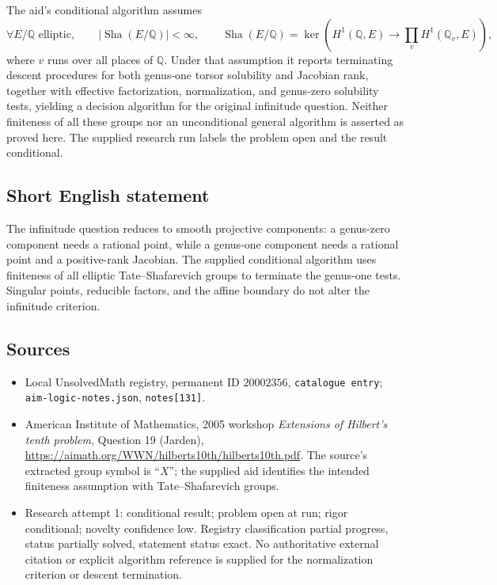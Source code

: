 \documentclass[11pt]{article}
\newcommand{\Q}{\mathbb{Q}}
\begin{document}
The aid's conditional algorithm assumes
\[
\forall E/\Q\text{ elliptic},\qquad |\operatorname{Sha}(E/\Q)|<\infty,
\qquad
\operatorname{Sha}(E/\Q)=\ker\left(H^1(\Q,E)\to\prod_v H^1(\Q_v,E)\right),
\]
where $v$ runs over all places of $\Q$. Under that assumption it reports terminating descent procedures for both genus-one torsor solubility and Jacobian rank, together with effective factorization, normalization, and genus-zero solubility tests, yielding a decision algorithm for the original infinitude question. Neither finiteness of all these groups nor an unconditional general algorithm is asserted as proved here. The supplied research run labels the problem open and the result conditional.
\subsection{Short English statement}
The infinitude question reduces to smooth projective components: a genus-zero component needs a rational point, while a genus-one component needs a rational point and a positive-rank Jacobian. The supplied conditional algorithm uses finiteness of all elliptic Tate--Shafarevich groups to terminate the genus-one tests. Singular points, reducible factors, and the affine boundary do not alter the infinitude criterion.
\subsection{Sources}
\begin{itemize}
\item Local UnsolvedMath registry, permanent ID $20002356$, \texttt{catalogue entry}; \texttt{aim-logic-notes.json}, \texttt{notes[131]}.
\item American Institute of Mathematics, 2005 workshop \emph{Extensions of Hilbert's tenth problem}, Question 19 (Jarden), \url{https://aimath.org/WWN/hilberts10th/hilberts10th.pdf}. The source's extracted group symbol is ``$X$''; the supplied aid identifies the intended finiteness assumption with Tate--Shafarevich groups.
\item Research attempt 1: conditional result; problem open at run; rigor conditional; novelty confidence low. Registry classification partial progress, status partially solved, statement status exact. No authoritative external citation or explicit algorithm reference is supplied for the normalization criterion or descent termination.
\end{itemize}
\end{document}
